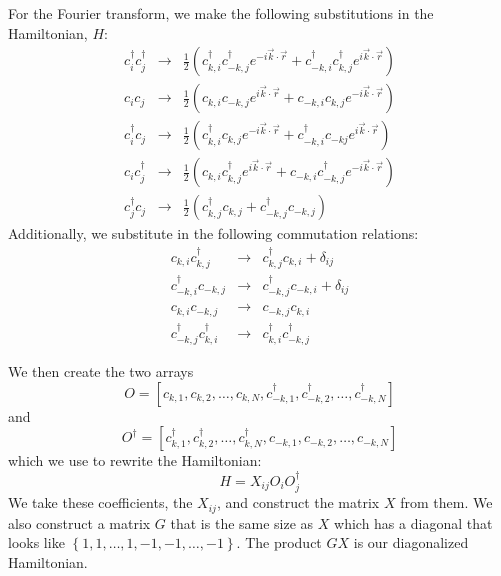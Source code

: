 \documentclass{article}[11pt]
\begin{document}
For the Fourier transform, we make the following substitutions in the Hamiltonian, $H$:
\begin{eqnarray}
	c_{i}^{\dagger}c_{j}^{\dagger} & \rightarrow & \frac{1}{2}\left(c_{k,i}^{\dagger}c_{-k,j}^{\dagger}e^{-i \vec{k} \cdot \vec{r}} + c_{-k,i}^{\dagger}c_{k,j}^{\dagger}e^{i \vec{k} \cdot \vec{r}}\right) \\
	c_{i}c_{j} & \rightarrow & \frac{1}{2}\left(c_{k,i}c_{-k,j}e^{i \vec{k} \cdot \vec{r}} + c_{-k,i}c_{k,j}e^{-i \vec{k} \cdot \vec{r}}\right) \\
	c_{i}^{\dagger}c_{j} & \rightarrow & \frac{1}{2}\left(c_{k,i}^{\dagger}c_{k,j}e^{-i \vec{k} \cdot \vec{r}} + c_{-k,i}^{\dagger}c_{-kj}e^{i \vec{k} \cdot \vec{r}}\right) \\
	c_{i}c_{j}^{\dagger} & \rightarrow & \frac{1}{2}\left(c_{k,i}c_{k,j}^{\dagger}e^{i \vec{k} \cdot \vec{r}} + c_{-k,i}c_{-k,j}^{\dagger}e^{-i \vec{k} \cdot \vec{r}}\right) \\	
	c_{j}^{\dagger}c_{j} & \rightarrow & \frac{1}{2}\left(c_{k,j}^{\dagger}c_{k,j}+c_{-k,j}^{\dagger}c_{-k,j}\right)
\end{eqnarray}
\noindent Additionally, we substitute in the following commutation relations:
\begin{eqnarray}
	c_{k,i}c_{k,j}^{\dagger} & \rightarrow & c_{k,j}^{\dagger}c_{k,i} + \delta_{ij} \\
	c_{-k,i}^{\dagger}c_{-k,j} & \rightarrow & c_{-k,j}^{\dagger}c_{-k,i} + \delta_{ij} \\	
	c_{k,i}c_{-k,j} & \rightarrow & c_{-k,j}c_{k,i} \\
	c_{-k,j}^{\dagger}c_{k,i}^{\dagger} & \rightarrow & c_{k,i}^{\dagger}c_{-k,j}^{\dagger}
\end{eqnarray}

We then create the two arrays
\begin{equation}
	O = \left[ c_{k,1}, c_{k,2}, \ldots , c_{k,N}, c_{-k,1}^{\dagger}, c_{-k,2}^{\dagger}, \ldots, c_{-k,N}^{\dagger} \right]
\end{equation}
and 
\begin{equation}
	O^{\dagger} = \left[ c_{k,1}^{\dagger}, c_{k,2}^{\dagger}, \ldots , c_{k,N}^{\dagger}, c_{-k,1}, c_{-k,2}, \ldots, c_{-k,N} \right]
\end{equation}
which we use to rewrite the Hamiltonian: 
\begin{equation}
	H = X_{ij} O_{i} O_{j}^{\dagger}
\end{equation}
We take these coefficients, the $X_{ij}$, and construct the matrix $X$ from them. We also construct a matrix $G$ that is the same size as $X$ which has a diagonal that looks like $\left\{1,1,\ldots,1,-1,-1,\ldots,-1\right\}$. The product $G X$ is our diagonalized Hamiltonian.  
\end{document}
